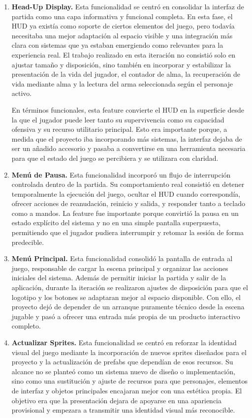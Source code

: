 \begin{enumerate}
\item \textbf{Head-Up Display.} Esta funcionalidad se centró en consolidar la interfaz de
partida como una capa informativa y funcional completa. En esta fase, el HUD ya existía como
soporte de ciertos elementos del juego, pero todavía necesitaba una mejor adaptación al
espacio visible y una integración más clara con sistemas que ya estaban emergiendo como
relevantes para la experiencia real. El trabajo realizado en esta iteración no consistió solo
en ajustar tamaño y disposición, sino también en incorporar y estabilizar la presentación de
la vida del jugador, el contador de alma, la recuperación de vida mediante alma y la lectura
del arma seleccionada según el personaje activo.

En términos funcionales, esta feature convierte el HUD en la superficie desde la que el
jugador puede leer tanto su supervivencia como su capacidad ofensiva y su recurso utilitario
principal. Esto era importante porque, a medida que el proyecto iba incorporando más
sistemas, la interfaz dejaba de ser un añadido accesorio y pasaba a convertirse en una
herramienta necesaria para que el estado del juego se percibiera y se utilizara con claridad.

\item \textbf{Menú de Pausa.} Esta funcionalidad incorporó un flujo de interrupción controlada
dentro de la partida. Su comportamiento real consistió en detener temporalmente la
ejecución del juego, ocultar el HUD cuando correspondía, ofrecer acciones de reanudación,
reinicio y salida, y responder tanto a teclado como a mandos. La feature fue importante
porque convirtió la pausa en un estado explícito del sistema y no en una simple pantalla
superpuesta, permitiendo que el jugador pudiera interrumpir y retomar la sesión de forma
predecible.

\item \textbf{Menú Principal.} Esta funcionalidad consolidó la pantalla de entrada al
juego, responsable de cargar la escena principal y organizar las acciones iniciales del
sistema. Además de permitir iniciar la partida y salir de la aplicación, durante la
iteración se realizaron ajustes de disposición para que el logotipo y los botones se
adaptaran mejor al espacio disponible. Con ello, el proyecto dejó de depender de un
arranque puramente técnico desde la escena jugable y pasó a ofrecer una entrada más propia
de un producto interactivo completo.

\item \textbf{Actualizar Sprites.} Esta funcionalidad se centró en reforzar la identidad
visual del juego mediante la incorporación de nuevos sprites diseñados para el proyecto y
la actualización de prefabs que dependían de esos recursos. Su alcance no se planteó como
un sistema nuevo de diseño o implementación, sino como una sustitución y ajuste de recursos
para que personajes, elementos de interfaz y objetos principales encajaran mejor con una
estética propia. El objetivo era que la presentación dejara de apoyarse en una apariencia
provisional y empezara a transmitir una identidad visual más reconocible.

\end{enumerate}

